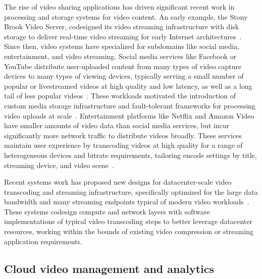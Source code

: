 The rise of video sharing applications has driven significant recent work in processing and storage systems for video content.
An early example, the Stony Brook Video Server, codesigned its video streaming infrastructure with disk storage to deliver real-time video streaming for early Internet architectures~\cite{vernick1996stonybrook}.
Since then, video systems have specialized for subdomains like social media, entertainment, and video streaming.
Social media services like Facebook or YouTube distribute user-uploaded content from many types of video capture devices to many types of viewing devices, typically serving a small number of popular or livestreamed videos at high quality and low latency, as well as a long tail of less popular videos~\cite{fblive, tang2017popularvid}.
These workloads motivated the introduction of custom media storage infrastructure and fault-tolerant frameworks for processing video uploads at scale~\cite{beaver2010haystack, muralidhar2014f4, huang2017sve, vbench}.
Entertainment platforms like Netflix and Amazon Video have smaller amounts of video data than social media services, but incur significantly more network traffic to distribute videos broadly.
These services maintain user experience by transcoding videos at high quality for a range of heterogeneous devices and bitrate requirements, tailoring encode settings by title, streaming device, and video scene~\cite{netflix2016mobilecoding,netflix2015pertitle,netflix2018dynamicopt,netflix2018shotbased}.

Recent systems work has proposed new designs for datacenter-scale video transcoding and streaming infrastructure, specifically optimized for the large data bandwidth and many streaming endpoints typical of modern video workloads~\cite{fouladi2017excamera, fouladi2018salsify,liu2016greenvid, asicclouds}.
These systems codesign compute and network layers with software implementations of typical video transcoding steps to better leverage datacenter resources, working within the bounds of existing video compression or streaming application requirements.

\subsection{Cloud video management and analytics}
\label{sec:related:vdbms}

